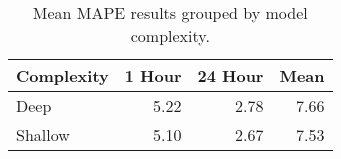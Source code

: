 \begin{table}[H]
\centering
\begin{tabular}{lrrr}
\toprule
Complexity & 1 Hour & 24 Hour & Mean \\
\midrule
Deep & 5.22 & 2.78 & 7.66 \\
Shallow & 5.10 & 2.67 & 7.53 \\
\bottomrule
\end{tabular}
\caption{Mean MAPE results grouped by model complexity.}
\label{complexity-MAPE}
\end{table}
